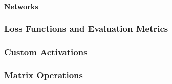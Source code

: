\documentclass[letterpaper,10pt,english]{sphinxmanual}
\begin{document}
\paragraph{Networks}
\label{node_ops:networks}





\subsubsection{Loss Functions and Evaluation Metrics}
\label{node_ops:loss-functions-and-evaluation-metrics}
{\hyperref[node_ops:node_ops.se]{\emph{}}}

{\hyperref[node_ops:node_ops.mse]{\emph{}}}

{\hyperref[node_ops:node_ops.rmse]{\emph{}}}

{\hyperref[node_ops:node_ops.mae]{\emph{}}}

{\hyperref[node_ops:node_ops.cross_entropy]{\emph{}}}

{\hyperref[node_ops:node_ops.other_cross_entropy]{\emph{}}}

{\hyperref[node_ops:node_ops.perplexity]{\emph{}}}

{\hyperref[node_ops:node_ops.detection]{\emph{}}}

{\hyperref[node_ops:node_ops.recall]{\emph{}}}

{\hyperref[node_ops:node_ops.precision]{\emph{}}}

{\hyperref[node_ops:node_ops.accuracy]{\emph{}}}

{\hyperref[node_ops:node_ops.fscore]{\emph{}}}


\subsubsection{Custom Activations}
\label{node_ops:custom-activations}
{\hyperref[node_ops:node_ops.ident]{\emph{}}}


{\hyperref[node_ops:node_ops.mult_log_reg]{\emph{}}}


\subsubsection{Matrix Operations}
\label{node_ops:matrix-operations}
{\hyperref[node_ops:node_ops.concat]{\emph{}}}
\end{document}
